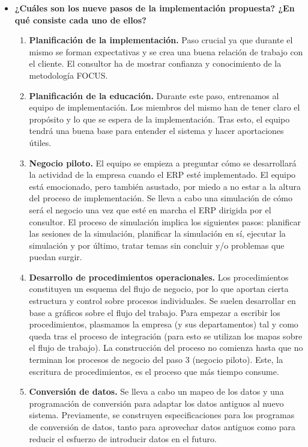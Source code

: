 \documentclass[11pt,a4paper]{article}
\begin{document}
\begin{itemize}
\item \textbf{¿Cuáles son los nueve pasos de la implementación propuesta? ¿En qué consiste cada uno de ellos?}
\begin{enumerate}
\item \textbf{Planificación de la implementación.} 
Paso crucial ya que durante el mismo se forman expectativas y se crea una buena relación de trabajo con el cliente. El consultor ha de mostrar confianza y conocimiento de la metodología FOCUS. 

\item \textbf{Planificación de la educación.} 
Durante este paso, entrenamos al equipo de implementación. Los miembros del mismo han de tener claro el propósito y lo que se espera de la implementación. Tras esto, el equipo tendrá una buena base para entender el sistema y hacer aportaciones útiles.

\item \textbf{Negocio piloto.}
El equipo se empieza a preguntar cómo se desarrollará la actividad de la empresa cuando el ERP esté implementado. El equipo está emocionado, pero también asustado, por miedo a no estar a la altura del proceso de implementación. Se lleva a cabo una simulación de cómo será el negocio una vez que esté en marcha el ERP dirigida por el consultor. El proceso de simulación implica los siguientes pasos: planificar las sesiones de la simulación, planificar la simulación en sí, ejecutar la simulación y por último, tratar temas sin concluir y/o problemas que puedan surgir.

\item \textbf{Desarrollo de procedimientos operacionales.}
Los procedimientos constituyen un esquema del flujo de negocio, por lo que aportan cierta estructura y control sobre procesos individuales. Se suelen desarrollar en base a gráficos sobre el flujo del trabajo. Para empezar a escribir los procedimientos, plasmamos la empresa (y sus departamentos) tal y como queda tras el proceso de integración (para esto se utilizan los mapas sobre el flujo de trabajo). La construcción del proceso no comienza hasta que no terminan los procesos de negocio del paso 3 (negocio piloto). Este, la escritura de procedimientos, es el proceso que más tiempo consume. 

\item \textbf{Conversión de datos.} 
Se lleva a cabo un mapeo de los datos y una programación de conversión para adaptar los datos antiguos al nuevo sistema. Previamente, se construyen especificaciones para los programas de conversión de datos, tanto para aprovechar datos antiguos como para reducir el esfuerzo de introducir datos en el futuro.


\end{enumerate}
\end{itemize}
\end{document}
